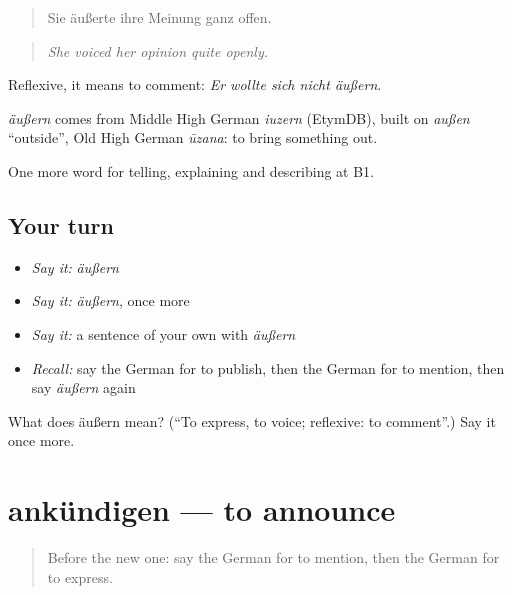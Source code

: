 \begin{quote}
Sie äußerte ihre Meinung ganz offen.
\end{quote}

\begin{quote}
\emph{She voiced her opinion quite openly.}
\end{quote}

Reflexive, it means to comment: \emph{Er wollte sich nicht äußern}.

\begin{cousinweb}
\emph{äußern} comes from Middle High German \emph{iuzern} (EtymDB), built on \emph{außen} \textquotedblleft{}outside\textquotedblright{}, Old High German \emph{ūzana}: to bring something out.
\end{cousinweb}

\begin{grammarlens}[title={What you've built}]
One more word for telling, explaining and describing at B1.
\end{grammarlens}

\subsection*{Your turn}
\begin{itemize}
\raggedright
  \item \emph{Say it:} \emph{äußern}
  \item \emph{Say it:} \emph{äußern}, once more
  \item \emph{Say it:} a sentence of your own with \emph{äußern}
  \item \emph{Recall:} say the German for to publish, then the German for to mention, then say \emph{äußern} again
\end{itemize}

\begin{tcolorbox}[breakable,colback=teal!4,colframe=teal!35!black,title={Before you move on}]
What does äußern mean? (\textquotedblleft{}To express, to voice; reflexive: to comment\textquotedblright{}.) Say it once more.
\end{tcolorbox}
\section[ankündigen]{ankündigen — to announce}

\label{lesson:GE-C273-ankuendigen}



\begin{quote}
Before the new one: say the German for to mention, then the German for to express.
\end{quote}

